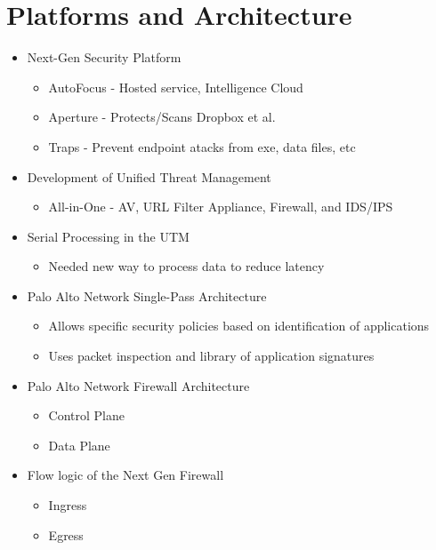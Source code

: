 

%

\maketitle

\section{Platforms and Architecture}
\begin{itemize}
    \item Next-Gen Security Platform
        \begin{itemize}
            \item AutoFocus - Hosted service, Intelligence Cloud
            \item Aperture - Protects/Scans Dropbox et al.
            \item Traps - Prevent endpoint atacks from exe, data files, etc
        \end{itemize}
    \item Development of Unified Threat Management
        \begin{itemize}
            \item All-in-One - AV, URL Filter Appliance, Firewall, and IDS/IPS
        \end{itemize}
    \item Serial Processing in the UTM
        \begin{itemize}
            \item Needed new way to process data to reduce latency
        \end{itemize}
    \item Palo Alto Network Single-Pass Architecture
        \begin{itemize}
            \item Allows specific security policies based on identification of applications
            \item Uses packet inspection and library of application signatures
        \end{itemize}
    \item Palo Alto Network Firewall Architecture
        \begin{itemize}
            \item Control Plane
            \item Data Plane
        \end{itemize}
    \item Flow logic of the Next Gen Firewall
        \begin{itemize}
            \item Ingress
            \item Egress
        \end{itemize}
\end{itemize}


